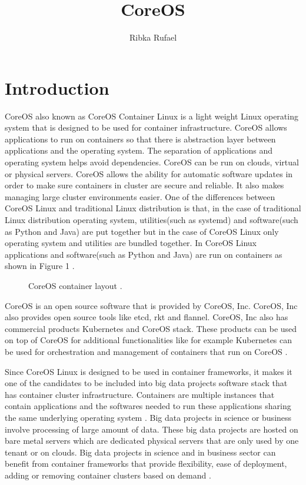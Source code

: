 \documentclass[9pt,twocolumn,twoside]{../../styles/osajnl}
\title{CoreOS}
\author[1, *]{Ribka Rufael}
\affil[1]{School of Informatics and Computing, Bloomington, IN 47408, U.S.A.}
\affil[*]{Corresponding authors: rrufael@umail.iu.edu HID: S17-IO-3016}
\begin{document}
\maketitle

\section{Introduction}

CoreOS also known as CoreOS Container Linux is a light weight Linux
operating system that is designed to be used for container
infrastructure. CoreOS allows applications to run on containers so
that there is abstraction layer between applications and the operating
system. The separation of applications and operating system helps
avoid dependencies.  CoreOS can be run on clouds, virtual or physical
servers. CoreOS allows the ability for automatic software updates in
order to make sure containers in cluster are secure and reliable. It
also makes managing large cluster environments easier. One of the
differences between CoreOS Linux and traditional Linux distribution is
that, in the case of traditional Linux distribution operating system,
utilities(such as systemd) and software(such as Python and Java) are
put together but in the case of CoreOS Linux only operating system and
utilities are bundled together. In CoreOS Linux applications and
software(such as Python and Java) are run on containers as shown in
Figure 1 \cite{www-core}.


\begin{figure}[htbp]
\centering
{}
\caption{CoreOS container layout  \cite{www-core}. }
\label{fig:false-color}
\end{figure}

CoreOS is an open source software that is provided by CoreOS,
Inc. CoreOS, Inc also provides open source tools like etcd, rkt and
flannel. CoreOS, Inc also has commercial products Kubernetes and
CoreOS stack. These products can be used on top of CoreOS for
additional functionalities like for example Kubernetes can be used for
orchestration and management of containers that run on CoreOS
\cite{www-core}.

Since CoreOS Linux is designed to be used in container frameworks, it
makes it one of the candidates to be included into big data projects
software stack that has container cluster infrastructure. Containers
are multiple instances that contain applications and the softwares
needed to run these applications sharing the same underlying operating
system \cite{julian2016containers}. Big data projects in science or
business involve processing of large amount of data.  These big data
projects are hosted on bare metal servers which are dedicated physical
servers that are only used by one tenant or on clouds. Big data
projects in science and in business sector can benefit from container
frameworks that provide flexibility, ease of deployment, adding or
removing container clusters based on demand
\cite{julian2016containers}.
\end{document}
